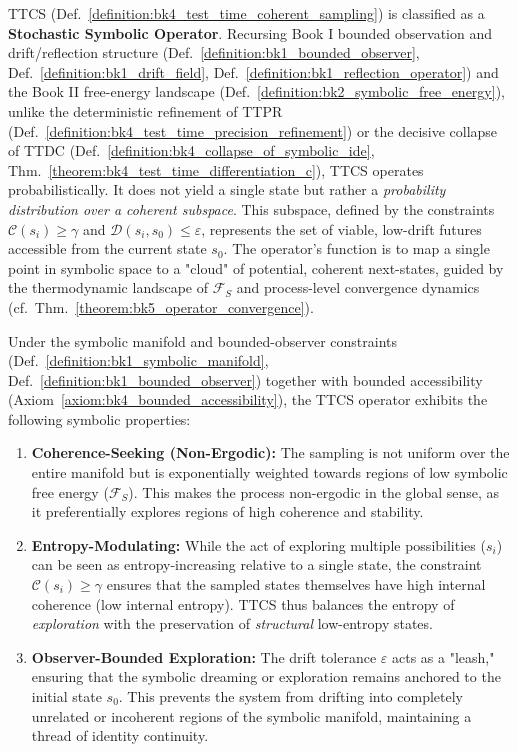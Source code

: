 \begin{scholium}
\label{scholium:bk4_ttcs_stochastic_operator}
TTCS (Def.~\ref{definition:bk4_test_time_coherent_sampling}) is classified as a \textbf{Stochastic Symbolic Operator}. Recursing Book I bounded observation and drift/reflection structure (Def.~\ref{definition:bk1_bounded_observer}, Def.~\ref{definition:bk1_drift_field}, Def.~\ref{definition:bk1_reflection_operator}) and the Book II free-energy landscape (Def.~\ref{definition:bk2_symbolic_free_energy}), unlike the deterministic refinement of TTPR (Def.~\ref{definition:bk4_test_time_precision_refinement}) or the decisive collapse of TTDC (Def.~\ref{definition:bk4_collapse_of_symbolic_ide}, Thm.~\ref{theorem:bk4_test_time_differentiation_c}), TTCS operates probabilistically. It does not yield a single state but rather a \emph{probability distribution over a coherent subspace}. This subspace, defined by the constraints $\mathcal{C}(s_i) \geq \gamma$ and $\mathcal{D}(s_i, s_0) \leq \varepsilon$, represents the set of viable, low-drift futures accessible from the current state $s_0$. The operator's function is to map a single point in symbolic space to a "cloud" of potential, coherent next-states, guided by the thermodynamic landscape of $\mathcal{F}_S$ and process-level convergence dynamics (cf.~Thm.~\ref{theorem:bk5_operator_convergence}).
\end{scholium}

\begin{lemma}
\label{lemma:bk4_properties_of_ttcs}
Under the symbolic manifold and bounded-observer constraints (Def.~\ref{definition:bk1_symbolic_manifold}, Def.~\ref{definition:bk1_bounded_observer}) together with bounded accessibility (Axiom~\ref{axiom:bk4_bounded_accessibility}), the TTCS operator exhibits the following symbolic properties:
\begin{enumerate}
    \item \textbf{Coherence-Seeking (Non-Ergodic):} The sampling is not uniform over the entire manifold but is exponentially weighted towards regions of low symbolic free energy ($\mathcal{F}_S$). This makes the process non-ergodic in the global sense, as it preferentially explores regions of high coherence and stability.
    \item \textbf{Entropy-Modulating:} While the act of exploring multiple possibilities ($s_i$) can be seen as entropy-increasing relative to a single state, the constraint $\mathcal{C}(s_i) \geq \gamma$ ensures that the sampled states themselves have high internal coherence (low internal entropy). TTCS thus balances the entropy of \emph{exploration} with the preservation of \emph{structural} low-entropy states.
    \item \textbf{Observer-Bounded Exploration:} The drift tolerance $\varepsilon$ acts as a "leash," ensuring that the symbolic dreaming or exploration remains anchored to the initial state $s_0$. This prevents the system from drifting into completely unrelated or incoherent regions of the symbolic manifold, maintaining a thread of identity continuity.
\end{enumerate}
\end{lemma}

